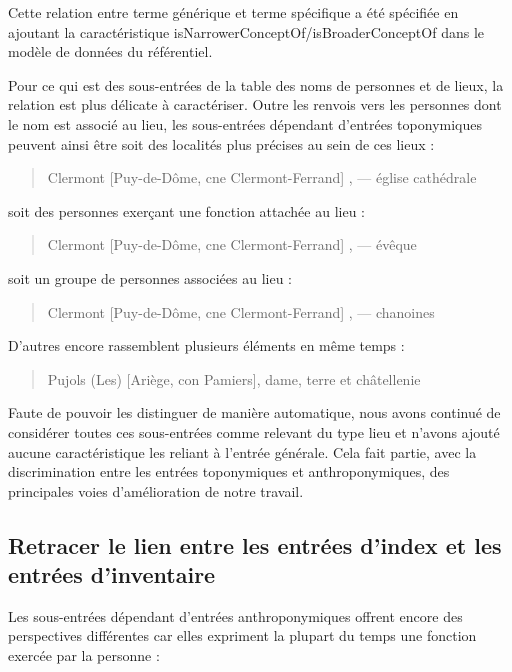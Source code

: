 \documentclass[a4paper,12pt,twoside]{book}
\begin{document}
	\noindent Cette relation entre terme générique et terme spécifique a été spécifiée en ajoutant la caractéristique \og isNarrowerConceptOf/isBroaderConceptOf\fg{} dans le modèle de données du référentiel.
	
	Pour ce qui est des sous-entrées de la table des noms de personnes et de lieux, la relation est plus délicate à caractériser. Outre les renvois vers les personnes dont le nom est associé au lieu, les sous-entrées dépendant d'entrées toponymiques peuvent ainsi être soit des localités plus précises au sein de ces lieux :
	
	\begin{quotation}
		Clermont [Puy-de-Dôme, cne Clermont-Ferrand] , — église
		cathédrale
	\end{quotation}
	
	\noindent soit des personnes exerçant une fonction attachée au lieu :
	
	\begin{quotation}
		Clermont [Puy-de-Dôme, cne Clermont-Ferrand] , — évêque
	\end{quotation}

	\noindent soit un groupe de personnes associées au lieu :
	
	\begin{quotation}
		Clermont [Puy-de-Dôme, cne Clermont-Ferrand] , —
		chanoines
	\end{quotation}
	
	\noindent D'autres encore rassemblent plusieurs éléments en même temps :
	
	\begin{quotation}
		Pujols (Les) [Ariège, con Pamiers], dame, terre et
		châtellenie
	\end{quotation}
	
	\noindent Faute de pouvoir les distinguer de manière automatique, nous avons continué de considérer toutes ces sous-entrées comme relevant du type \og lieu\fg{} et n'avons ajouté aucune caractéristique les reliant à l'entrée générale. Cela fait partie, avec la discrimination entre les entrées toponymiques et anthroponymiques, des principales voies d'amélioration de notre travail.
	
	\subsection{Retracer le lien entre les entrées d’index et les entrées d’inventaire}
	
	Les sous-entrées dépendant d'entrées anthroponymiques offrent encore des perspectives différentes car elles expriment la plupart du temps une fonction exercée par la personne :
	
\end{document}
